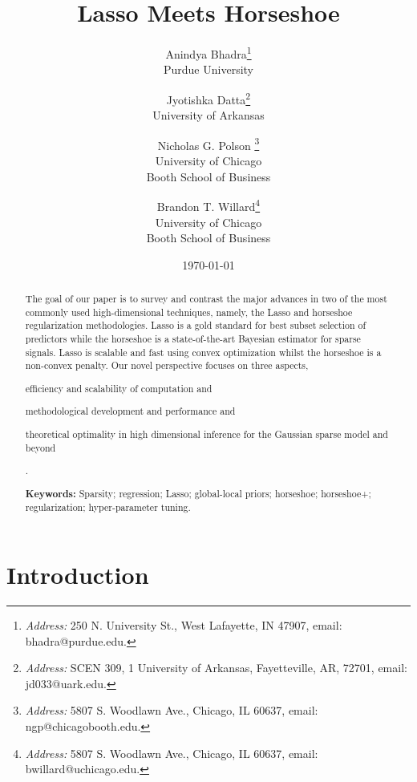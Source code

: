 \documentclass[11pt]{article}
\title{Lasso Meets Horseshoe}
\author{
  Anindya Bhadra\footnote{
  {\em Address:} 250 N. University St., West Lafayette, IN 47907, 
  email: bhadra@purdue.edu.} \\
  Purdue University
  \and Jyotishka Datta\footnote{
  {\em Address:} SCEN 309, 1 University of Arkansas, Fayetteville, AR, 72701, 
  email: jd033@uark.edu.}\\ 
  University of Arkansas \\
  \and Nicholas G. Polson \footnote{
  {\em Address:} 5807 S. Woodlawn Ave., Chicago, IL 60637, 
  email: ngp@chicagobooth.edu.}  \\
  University of Chicago  \\
  Booth School of Business
  \and 
  Brandon T. Willard\footnote{
  {\em Address:} 5807 S. Woodlawn Ave., Chicago, IL 60637, 
  email: bwillard@uchicago.edu.} \\
  University of Chicago  \\
  Booth School of Business
}
\date{\today}
\begin{document}
\maketitle
\onehalfspacing


\begin{abstract}
\baselineskip=15pt
\noindent %
The goal of our paper is to survey and contrast the major advances in two of the most commonly used high-dimensional techniques, namely, the Lasso and horseshoe regularization methodologies. Lasso is a gold standard for best subset selection of predictors while the horseshoe is a state-of-the-art Bayesian estimator for sparse signals. Lasso is scalable and fast using convex optimization whilst the horseshoe is a non-convex penalty.  Our novel perspective focuses on three aspects, 
\begin{enumerate*}
  \item efficiency and scalability of computation and 
  \item methodological development and performance and 
  \item theoretical optimality in high dimensional inference for the Gaussian
    sparse model and beyond
\end{enumerate*}. 


{\bf Keywords:} Sparsity; regression; Lasso; global-local priors; horseshoe; horseshoe+; regularization; hyper-parameter tuning. 
\end{abstract}

\section{Introduction}

\end{document}
